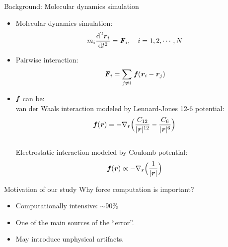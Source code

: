 \documentclass{beamer}
\newcommand{\redc}[1]{{\color{red} #1}}
\newcommand{\bluec}[1]{{\color{blue} #1}}
\newcommand{\vect}[1]{\textbf{\textit{#1}}}
\renewcommand{\d}[1]{\textrm{#1}}
\begin{document}
\begin{frame}{Background: Molecular dynamics simulation}
  \begin{itemize}\itemsep -10pt
  \item<1-> Molecular dynamics simulation:
    \bluec{
      \begin{align*}
        m_i \frac{\d d^2\vect r_i}{\d dt^2} = \vect F_i, \quad i = 1, 2, \cdots, N
      \end{align*}
    }
  \item<2-> Pairwise interaction:
    \bluec{
      \begin{align*}
        \vect F_i = \sum_{j\neq i}\, \vect f(\vect r_i - \vect r_j)
      \end{align*}}
  \item<3-> \bluec{$\vect f$} can be:\\
    van der Waals interaction modeled by Lennard-Jones 12-6 potential:
    \bluec{
      \begin{align*}
        \vect f(\vect r) = -\nabla_{\vect r}
        \Big(
        \frac{C_{12}}{\vert\vect r\vert^{12}}
        -\frac{C_{6}}{\vert\vect r\vert^{6}}
        \Big)
      \end{align*}
    }\\
    Electrostatic interaction modeled by Coulomb potential:
    \bluec{
      \begin{align*}
        \vect f(\vect r) \propto -\nabla_{\vect r}
        \Big(
        \frac{1}{\vert \vect r\vert}
        \Big)
      \end{align*}}
  \end{itemize}
\end{frame}

\begin{frame}{Motivation of our study}
  Why force computation is important?
  \begin{itemize}\itemsep 3pt
  \item <2->Computationally intensive: \redc{$ \sim 90 \%$}
  \item <3->One of the main sources of the \redc{``error''}.
  \item <4->May introduce \redc{unphysical artifacts}.
  \end{itemize}
  \vfill
\end{frame}
\end{document}

